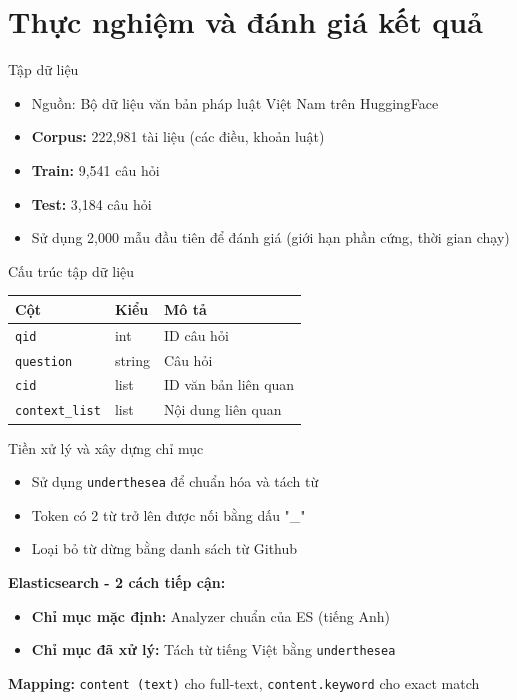 \documentclass[serif, aspectratio=169]{beamer}
\begin{document}
\section{Thực nghiệm và đánh giá kết quả}
\begin{frame}{Tập dữ liệu}
\begin{itemize}
    \item Nguồn: Bộ dữ liệu văn bản pháp luật Việt Nam trên HuggingFace \cite{dataset}
    \item \textbf{Corpus:} 222,981 tài liệu (các điều, khoản luật)
    \item \textbf{Train:} 9,541 câu hỏi
    \item \textbf{Test:} 3,184 câu hỏi
    \item Sử dụng 2,000 mẫu đầu tiên để đánh giá (giới hạn phần cứng, thời gian chạy)
\end{itemize}
\end{frame}

\begin{frame}{Cấu trúc tập dữ liệu}
\begin{table}
\centering
\small
\begin{tabular}{|l|l|l|}
\hline
Cột & Kiểu & Mô tả \\ \hline
\texttt{qid} & int & ID câu hỏi \\ \hline
\texttt{question} & string & Câu hỏi \\ \hline
\texttt{cid} & list & ID văn bản liên quan \\ \hline
\texttt{context\_list} & list & Nội dung liên quan \\ \hline
\end{tabular}
\end{table}
\end{frame}

\begin{frame}{Tiền xử lý và xây dựng chỉ mục}
\begin{itemize}
    \item Sử dụng \texttt{underthesea} \cite{underthesea} để chuẩn hóa và tách từ
    \item Token có 2 từ trở lên được nối bằng dấu "\_"
    \item Loại bỏ từ dừng bằng danh sách từ Github \cite{vietnamese_stopwords}
\end{itemize}
\vspace{0.3cm}
\textbf{Elasticsearch - 2 cách tiếp cận:}
\begin{itemize}
    \item \textbf{Chỉ mục mặc định:} Analyzer chuẩn của ES (tiếng Anh)
    \item \textbf{Chỉ mục đã xử lý:} Tách từ tiếng Việt bằng \texttt{underthesea}
\end{itemize}
\vspace{0.3cm}
\textbf{Mapping:} \texttt{content (text)} cho full-text, \texttt{content.keyword} cho exact match
\end{frame}
\end{document}

